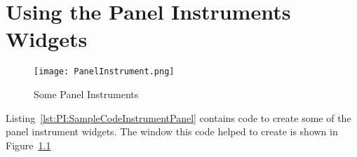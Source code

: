 
\chapter{Using the Panel Instruments Widgets}
\label{chapt:PanelInstruments}

\begin{figure}[hbpt]
\begin{centering}
\texttt{[image: PanelInstrument.png]}
\caption{Some Panel Instruments}
\label{fig:PI:PanelInstrument}
\end{centering}
\end{figure}
Listing~\ref{lst:PI:SampleCodeInstrumentPanel} contains code to create
some of the panel instrument widgets.  The window this code
helped to create is shown in Figure~\ref{fig:PI:PanelInstrument}

